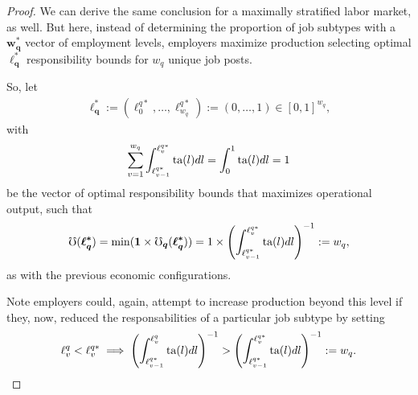 \documentclass[hidelinks, nonatbib]{elsarticle}
\begin{document}
\begin{lemma}
\begin{proof}
        We can derive the same conclusion for a maximally stratified labor market, as well. But here, instead of determining the proportion of job subtypes with a $\boldsymbol{w_{q}^{*}}$ vector of employment levels, employers maximize production selecting optimal $\boldsymbol{\ell_{q}^{*}}$ responsibility bounds for $w_q$ unique job posts.
        
        So, let 
        \begin{gather}
            \boldsymbol{\ell_{q}^{*}}
            :=
            (\ell_{0}^{q*}, \dots, \ell_{w_q}^{q*})
            :=
            (0, \dots, 1) 
            \in [0,1]^{w_q}
            ,
        \end{gather}
        with
        \begin{gather}
        \sum_{v=1}^{w_q}
        \int_{
            \ell_{v-1}^{q*}
        }^{
            \ell_{v}^{q*}
        }
        \text{ta}(l)dl
        =
        \int_{0}^{1}
        \text{ta}(l)dl
        =
        1
        \end{gather}
        be the vector of optimal responsibility bounds that maximizes operational output, such that
        \begin{gather}
            \mho(\boldsymbol{\ell_{q}^{*}})
            =
            \min(
                \boldsymbol{1}
                \times
                \boldsymbol{\mho_q}(
                    \boldsymbol{\ell_{q}^{*}}
                )
            )
            =
            1
            \times
            \left(
                \int_{
                    \ell_{v-1}^{q*}
                }^{
                    \ell_{v}^{q*}
                }
                \text{ta}(l)dl
            \right) ^ {-1}
            :=
            w_q
            ,
        \end{gather}
        as with the previous economic configurations.
        
        Note employers could, again, attempt to increase production beyond this level if they, now, reduced the responsabilities of a particular job subtype by setting
        \begin{align}
        \ell_{v}^{q} < \ell_{v}^{q*}
        \implies
            \left(
                \int_{
                    \ell_{v-1}^{q*}
                }^{
                    \ell_{v}^{q}
                }
                \text{ta}(l)dl
            \right) ^ {-1}
            >
            \left(
                \int_{
                    \ell_{v-1}^{q*}
                }^{
                    \ell_{v}^{q*}
                }
                \text{ta}(l)dl
            \right) ^ {-1}
            :=
            w_q
            .
        \end{align}
        

\end{proof}
\end{lemma}
\end{document}
